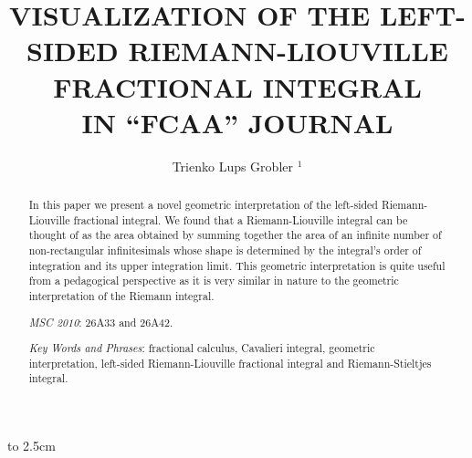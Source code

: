 \documentclass[twoside,reqno,11pt]{fcaa-var} %
\title[VISUALIZATION OF FRACTIONAL INTEGRALS]{VISUALIZATION OF THE LEFT-SIDED RIEMANN-LIOUVILLE FRACTIONAL INTEGRAL \\ [3pt] IN ``FCAA'' JOURNAL}
\author[\normalsize T.L Grobler]{\normalsize Trienko Lups Grobler $^1$}
\begin{document}
 \vbox to 2.5cm { \vfill }


 \bigskip \medskip

 \begin{abstract}In this paper we present a novel geometric interpretation of the left-sided Riemann-Liouville fractional integral. We found that a Riemann-Liouville integral can be thought of as the area obtained by summing together the area of an infinite number of non-rectangular infinitesimals whose shape is determined by the integral's order of integration and its upper integration limit. This geometric interpretation is quite useful from a pedagogical perspective as it is very similar
in nature to the geometric interpretation of the Riemann integral. 

 \medskip

{\it MSC 2010\/}: 26A33 and 26A42.%

 \smallskip

{\it Key Words and Phrases}: fractional calculus, Cavalieri integral, geometric interpretation, left-sided Riemann-Liouville fractional integral and Riemann-Stieltjes integral.


\end{abstract}

 \maketitle

 \vspace*{-16pt}

\end{document}
